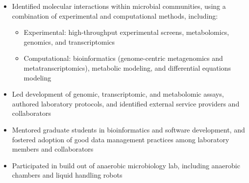 \documentclass[letterpaper,10pt]{article}
\begin{document}
\begin{itemize}
\begin{itemize}
			\item Identified molecular interactions within microbial communities, using a combination of experimental and computational methods, including: 
				\begin{itemize}
				\item Experimental: high-throughput experimental screens, metabolomics, genomics, and transcriptomics
				\item Computational: bioinformatics (genome-centric metagenomics and metatranscriptomics), metabolic modeling, and differential equations modeling
				\end{itemize}
			\item Led development of genomic, transcriptomic, and metabolomic assays, authored laboratory protocols, and identified external service providers and collaborators
			\item Mentored graduate students in bioinformatics and software development, and fostered adoption of good data management practices among laboratory members and collaborators
			\item Participated in build out of anaerobic microbiology lab, including anaerobic chambers and liquid handling robots

\end{itemize}
\end{itemize}
\end{document}
